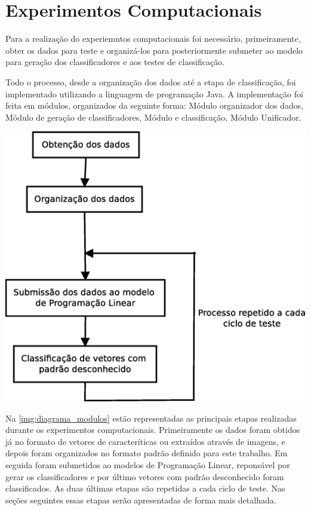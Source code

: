 \chapter{Experimentos Computacionais}

Para a realização do experiemntos computacionais foi necessário, primeiramente, obter os dados para teste e organizá-los para posteriormente submeter ao modelo para geração dos classificadores e aos testes de classificação.

Todo o processo, desde a organização dos dados até a etapa de classificação, foi implementado utilizando a linguagem de programação Java. A implementação foi feita em módulos, organizados da seguinte forma: Módulo organizador dos dados, Módulo de geração de classificadores, Módulo e classificação, Módulo Unificador.

\begin{center}
	\includegraphics[scale=0.5]{graficos/diagrama_modulos}
	\label{img:diagrama_modulos}
\end{center}

Na \ref{img:diagrama_modulos} estão representadas as principais etapas realizadas durante os experimentos computacionais. Primeiramente os dados foram obtidos já no formato de vetores de caracteríticas ou extraídos através de imagens, e depois foram organizados no formato padrão definido para este trabalho. Em seguida foram submetidos ao modelos de Programação Linear, reponsável por gerar os classificadores e por último vetores com padrão desconhecido foram classificados. As duas últimas etapas são repetidas a cada ciclo de teste. Nas seções seguintes essas etapas serão apresentadas de forma mais detalhada.

